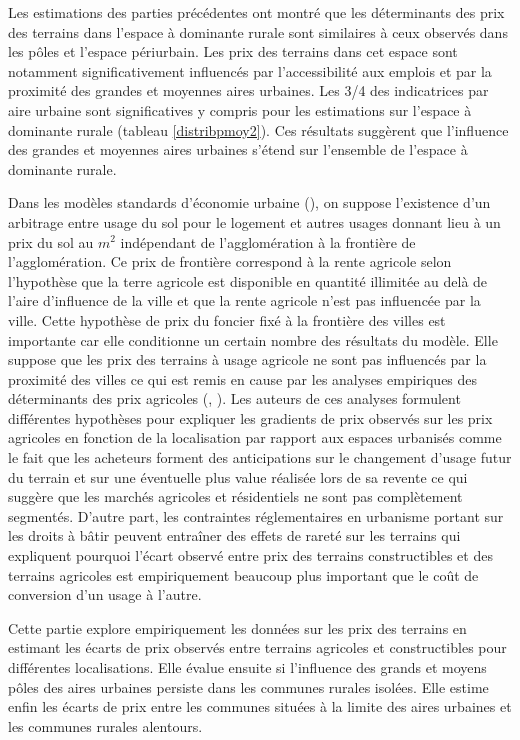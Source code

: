 \documentclass[10.5pt,a4paper]{article}
\begin{document}
{Les estimations des parties précédentes ont montré que les déterminants des prix des terrains dans l'espace à dominante rurale sont similaires à ceux observés dans les pôles et l'espace périurbain. Les prix des terrains dans cet espace sont notamment significativement influencés par l'accessibilité aux emplois et par la proximité des grandes et moyennes aires urbaines. Les 3/4 des indicatrices par aire urbaine sont significatives y compris pour les estimations sur l'espace à dominante rurale (tableau \ref{distribpmoy2}). Ces résultats suggèrent que l'influence des grandes et moyennes aires urbaines s'étend sur l'ensemble de l'espace à dominante rurale. \par

Dans les modèles standards d'économie urbaine (\cite{Alonso64,Mills67,Muth69}), on suppose l’existence d’un arbitrage entre usage du sol pour le logement et autres usages donnant lieu à un prix du sol au $m^2$ indépendant de l’agglomération à la frontière de l'agglomération. Ce prix de frontière correspond à la rente agricole selon l'hypothèse que la terre agricole est disponible en quantité illimitée au delà de l'aire d'influence de la ville et que la rente agricole n'est pas influencée par la ville. Cette hypothèse de prix du foncier fixé à la frontière des villes est importante car elle conditionne un certain nombre des résultats du modèle. Elle suppose que les prix des terrains à usage agricole ne sont pas influencés par la proximité des villes ce qui est remis en cause par les analyses empiriques des déterminants des prix agricoles (\cite{Cava03}, \cite{Geniaux05}). Les auteurs de ces analyses formulent différentes hypothèses pour expliquer les gradients de prix observés sur les prix agricoles en fonction de la localisation par rapport aux espaces urbanisés comme le fait que les acheteurs forment des anticipations sur le changement d'usage futur du terrain et sur une éventuelle plus value réalisée lors de sa revente ce qui suggère que les marchés agricoles et résidentiels ne sont pas complètement segmentés. D'autre part, les contraintes réglementaires en urbanisme portant sur les droits à bâtir peuvent entraîner des effets de rareté sur les terrains qui expliquent pourquoi l'écart observé entre prix des terrains constructibles et des terrains agricoles est empiriquement beaucoup plus important que le coût de conversion d'un usage à l'autre. \par 

Cette partie explore empiriquement les données sur les prix des terrains en estimant les écarts de prix observés entre terrains agricoles et constructibles pour différentes localisations. Elle évalue ensuite si l'influence des grands et moyens pôles des aires urbaines persiste dans les communes rurales isolées. Elle estime enfin les écarts de prix entre les communes situées à la  limite des aires urbaines et les communes rurales alentours. \par

}
\end{document}
